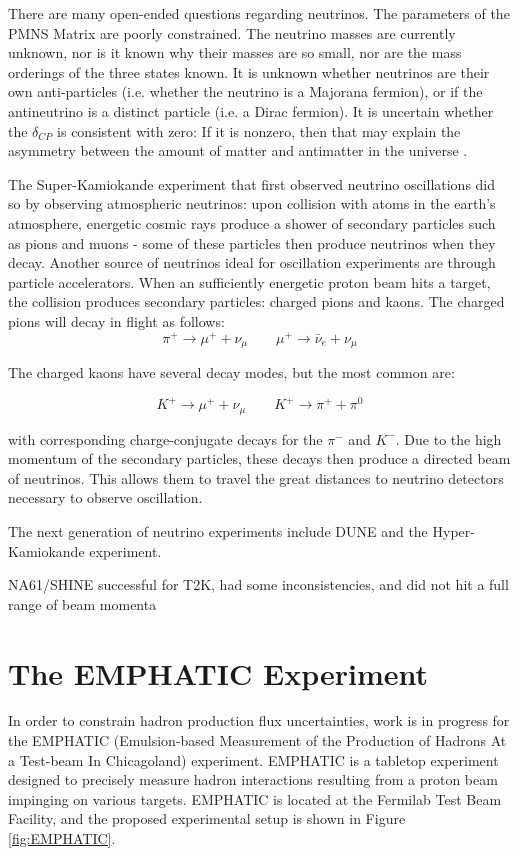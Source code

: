 There are many open-ended questions regarding neutrinos.
The parameters of the PMNS Matrix are poorly constrained.
The neutrino masses are currently unknown, nor is it known why their masses are so small, nor are the mass orderings of the three states known.
It is unknown whether neutrinos are their own anti-particles (i.e. whether the neutrino is a Majorana fermion), or if the antineutrino is a distinct particle (i.e. a Dirac fermion). It is uncertain whether the $\delta_{CP}$ is consistent with zero: If it is nonzero, then that may explain the asymmetry between the amount of matter and antimatter in the universe \cite{neutrinoCP}.

The Super-Kamiokande experiment that first observed neutrino oscillations did so by observing atmospheric neutrinos: upon collision with atoms in the earth's atmosphere, energetic cosmic rays produce a shower of secondary particles such as pions and muons - some of these particles then produce neutrinos when they decay. Another source of neutrinos ideal for oscillation experiments are through particle accelerators. When an sufficiently energetic proton beam hits a target, the collision produces secondary particles: charged pions and kaons. The charged pions will decay in flight as follows:
$$ \pi^+ \rightarrow \mu^+ + \nu_\mu \quad \quad \mu^+ \rightarrow \bar{\nu}_e + \nu_\mu$$

The charged kaons have several decay modes, but the most common are:

$$ K^+ \rightarrow \mu^+ + \nu_\mu \quad \quad K^+ \rightarrow \pi^+ + \pi^0$$

with corresponding charge-conjugate decays for the $\pi^-$ and $K^-$. Due to the high momentum of the secondary particles, these decays then produce a directed beam of neutrinos. This allows them to travel the great distances to neutrino detectors necessary to observe oscillation.

The next generation of neutrino experiments include DUNE and the Hyper-Kamiokande experiment. 

NA61/SHINE successful for T2K, had some inconsistencies, and did not hit a full range of beam momenta

 \section{The EMPHATIC Experiment}

In order to constrain hadron production flux uncertainties, work is in progress for the EMPHATIC (Emulsion-based Measurement of the Production of Hadrons At a Test-beam In Chicagoland) experiment. EMPHATIC is a tabletop experiment designed to precisely measure hadron interactions resulting from a proton beam impinging on various targets. EMPHATIC is located at the Fermilab Test Beam Facility, and the proposed experimental setup is shown in Figure \ref{fig:EMPHATIC}.

